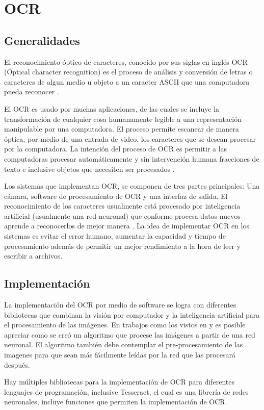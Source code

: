 \section{OCR}
\subsection{Generalidades}
El reconocimiento óptico de caracteres, conocido por sus siglas en inglés OCR (Optical character recognition) es el proceso de análisis y conversión de letras o caracteres de algun medio u objeto a un caracter ASCII que una computadora pueda reconocer \cite{nallasamy}.
\par
El OCR es usado por muchas aplicaciones, de las cuales se incluye la transformación de cualquier cosa humanamente legible a una representación manipulable por una computadora. El proceso permite escanear de manera óptica, por medio de una entrada de video, los caracteres que se desean procesar por la computadora. La intención del proceso de OCR es permitir a las computadoras procesar automáticamente y sin intervención humana fracciones de texto e inclusive objetos que necesiten ser procesados \cite{Shah2009}.
\par
Los sistemas que implementan OCR, se componen de tres partes principales: Una cámara, software de procesamiento de OCR y una interfaz de salida. El reconocimiento de los caracteres usualmente está procesado por inteligencia artificial (usualmente una red neuronal) que conforme procesa datos nuevos aprende a reconocerlos de mejor manera \cite{Shah2009}. La idea de implementar OCR en los sistemas es evitar el error humano, aumentar la capacidad y tiempo de procesamiento además de permitir un mejor rendimiento a la hora de leer y escribir a archivos. 

\subsection{Implementación}
La implementación del OCR por medio de software se logra con diferentes bibliotecas que combinan la visión por computador y la inteligencia artificial para el procesamiento de las imágenes. En trabajos como los vistos en \cite{nallasamy} y \cite{Shah2009} es posible apreciar como se creó un algoritmo que procese las imágenes a partir de una red neuronal. El algoritmo también debe contemplar el pre-procesamiento de las imagenes para que sean más fácilmente leídas por la red que las procesará después.
\par
Hay múltiples bibliotecas para la implementación de OCR para diferentes lenguajes de programación, inclusive Tesseract, el cual es una librería de redes neuronales, incluye funciones que permiten la implementación de OCR.

